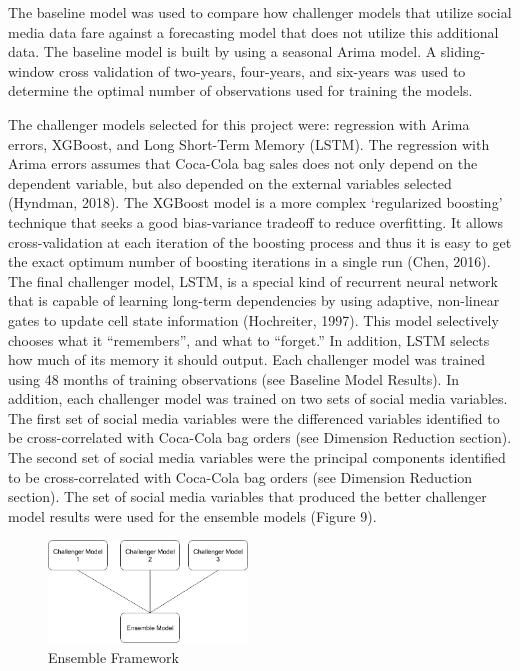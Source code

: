 \documentclass[12pt,oneside]{chicagocapstone}
\begin{document}
The baseline model was used to compare how challenger models that utilize social media data fare against a forecasting model that does not utilize this additional data. The baseline model is built by using a seasonal Arima model. A sliding-window cross validation of two-years, four-years, and six-years was used to determine the optimal number of observations used for training the models.

The challenger models selected for this project were: regression with Arima errors, XGBoost, and Long Short-Term Memory (LSTM). The regression with Arima errors assumes that Coca-Cola bag sales does not only depend on the dependent variable, but also depended on the external variables selected (Hyndman, 2018). The XGBoost model is a more complex `regularized boosting' technique that seeks a good bias-variance tradeoff to reduce overfitting. It allows cross-validation at each iteration of the boosting process and thus it is easy to get the exact optimum number of boosting iterations in a single run (Chen, 2016). The final challenger model, LSTM, is a special kind of recurrent neural network that is capable of learning long-term dependencies by using adaptive, non-linear gates to update cell state information (Hochreiter, 1997). This model selectively chooses what it ``remembers'', and what to ``forget.'' In addition, LSTM selects how much of its memory it should output. Each challenger model was trained using 48 months of training observations (see Baseline Model Results). In addition, each challenger model was trained on two sets of social media variables. The first set of social media variables were the differenced variables identified to be cross-correlated with Coca-Cola bag orders (see Dimension Reduction section). The second set of social media variables were the principal components identified to be cross-correlated with Coca-Cola bag orders (see Dimension Reduction section). The set of social media variables that produced the better challenger model results were used for the ensemble models (Figure 9).
\begin{figure}

{\centering \includegraphics[width=200px,angle = 0, scale=2.1]{figure/socialmedia_ensemble_framework} 

}

\caption{Ensemble Framework}\label{fig:GoogleTrends2}
\end{figure}
\end{document}
